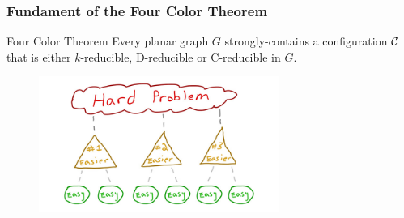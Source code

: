 \begin{frame}
    \frametitle{Fundament of the Four Color Theorem}

    \begin{alertblock}{Four Color Theorem}
        Every planar graph $G$ strongly-contains a configuration $\mathcal{C}$ that is either $k$-reducible, D-reducible or C-reducible in $G$.
    \end{alertblock}

    \begin{figure}
        \centering
        \includegraphics[width=0.7\textwidth]{images/breakdown.jpg}
    \end{figure}
\end{frame}